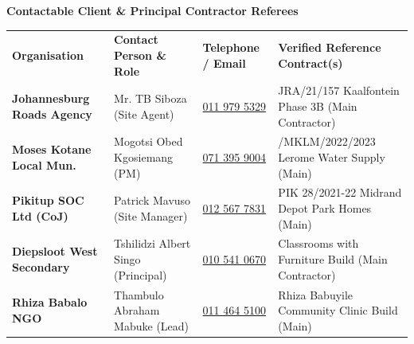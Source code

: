 \documentclass[a4paper,11pt]{article}
\begin{document}
\vfill

{\large\bfseries\color{mhnavy} Contactable Client \& Principal Contractor Referees}
\vspace{0.10cm}

\renewcommand{\arraystretch}{1.27}
\noindent
\begin{tabularx}{\textwidth}{@{}
    >{\raggedright\arraybackslash}p{3.4cm}
    >{\raggedright\arraybackslash}p{3.2cm}
    >{\raggedright\arraybackslash}p{4.0cm}
    >{\raggedright\arraybackslash}X
@{}}
\rowcolor{mhnavy}
{\color{white}\bfseries\fontsize{7.9pt}{9.6pt}\selectfont Organisation} &
{\color{white}\bfseries\fontsize{7.9pt}{9.6pt}\selectfont Contact Person \& Role} &
{\color{white}\bfseries\fontsize{7.9pt}{9.6pt}\selectfont Telephone / Email} &
{\color{white}\bfseries\fontsize{7.9pt}{9.6pt}\selectfont Verified Reference Contract(s)} \\
\rowcolor{mhbluelight}
\fontsize{7.5pt}{9.3pt}\selectfont\bfseries Johannesburg Roads Agency & \fontsize{7.5pt}{9.3pt}\selectfont Mr. TB Siboza (Site Agent) & \fontsize{7.5pt}{9.3pt}\selectfont \href{tel:0119795329}{011 979 5329} & \fontsize{7.5pt}{9.3pt}\selectfont JRA/21/157 Kaalfontein Phase 3B (Main Contractor) \\
\fontsize{7.5pt}{9.3pt}\selectfont\bfseries Moses Kotane Local Mun. & \fontsize{7.5pt}{9.3pt}\selectfont Mogotsi Obed Kgosiemang (PM) & \fontsize{7.5pt}{9.3pt}\selectfont \href{tel:0713959004}{071 395 9004} & \fontsize{7.5pt}{9.3pt}\selectfont 014/MKLM/2022/2023 Lerome Water Supply (Main) \\
\rowcolor{mhbluelight}
\fontsize{7.5pt}{9.3pt}\selectfont\bfseries Pikitup SOC Ltd (CoJ) & \fontsize{7.5pt}{9.3pt}\selectfont Patrick Mavuso (Site Manager) & \fontsize{7.5pt}{9.3pt}\selectfont \href{tel:0125677831}{012 567 7831} & \fontsize{7.5pt}{9.3pt}\selectfont PIK 28/2021-22 Midrand Depot Park Homes (Main) \\
\fontsize{7.5pt}{9.3pt}\selectfont\bfseries Diepsloot West Secondary & \fontsize{7.5pt}{9.3pt}\selectfont Tshilidzi Albert Singo (Principal) & \fontsize{7.5pt}{9.3pt}\selectfont \href{tel:0105410670}{010 541 0670} & \fontsize{7.5pt}{9.3pt}\selectfont 4 Classrooms with Furniture Build (Main Contractor) \\
\rowcolor{mhbluelight}
\fontsize{7.5pt}{9.3pt}\selectfont\bfseries Rhiza Babalo NGO & \fontsize{7.5pt}{9.3pt}\selectfont Thambulo Abraham Mabuke (Lead) & \fontsize{7.5pt}{9.3pt}\selectfont \href{tel:0114645100}{011 464 5100} & \fontsize{7.5pt}{9.3pt}\selectfont Rhiza Babuyile Community Clinic Build (Main) \\

\end{tabularx}
\end{document}

